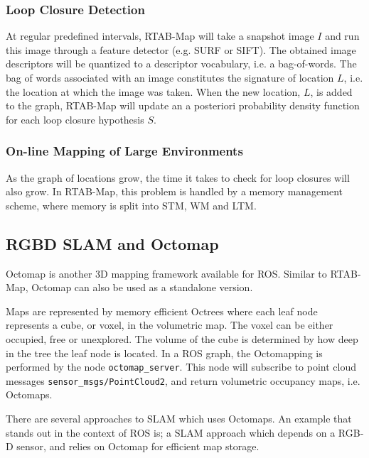 \subsubsection{Loop Closure Detection}

At regular predefined intervals, \ac{RTAB-Map} will take a snapshot image $I$ and run this image through a feature detector (e.g. \ac{SURF} or \ac{SIFT}). The obtained image descriptors will be quantized to a descriptor vocabulary, i.e. a bag-of-words. The bag of words associated with an image constitutes the signature of location $L$, i.e. the location at which the image was taken. When the new location, $L$, is added to the graph, \ac{RTAB-Map} will update an a posteriori probability density function for each loop closure hypothesis $S$. 

\subsubsection{On-line Mapping of Large Environments}

As the graph of locations grow, the time it takes to check for loop closures will also grow. In \ac{RTAB-Map}, this problem is handled by a memory management scheme, where memory is split into \ac{STM}, \ac{WM} and \ac{LTM}.

\subsection{RGBD SLAM and Octomap}

Octomap\cite{hornung13auro} is another 3D mapping framework available for \ac{ROS}. Similar to \ac{RTAB-Map}, Octomap can also be used as a standalone version. 

Maps are represented by memory efficient Octrees where each leaf node represents a cube, or voxel, in the volumetric map. The voxel can be either occupied, free or unexplored. The volume of the cube is determined by how deep in the tree the leaf node is located. In a \ac{ROS} graph, the Octomapping is performed by the node \texttt{octomap\_server}. This node  will subscribe to point cloud messages \texttt{sensor\_msgs/PointCloud2}, and return volumetric occupancy maps, i.e. Octomaps.

There are several approaches to \ac{SLAM}  which uses Octomaps. An example that stands out in the context of \ac{ROS} is\cite{endres20143}; a \ac{SLAM} approach which depends on a RGB-D sensor, and relies on Octomap for efficient map storage.


